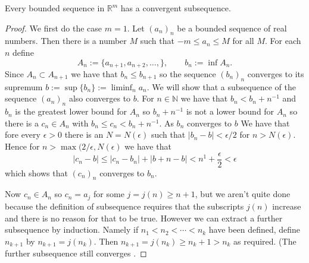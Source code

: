 \documentclass[10pt,a4paper,UTF8]{article}
\begin{document}
\begin{theorem}
Every bounded sequence in \(\mathbb{R}^m\) has a convergent subsequence.
\end{theorem}

\begin{proof}
We first do the case \(m=1\). Let \((a_n)_n\) be a bounded sequence of real numbers. Then
there is a number \(M\) such that \(-m\le a_n\le M\) for all \(M\). For each \(n\) define
\begin{equation*}
  A_n:=\{a_{n+1},a_{n+2},\ldots,\}, \qquad b_n:=\inf A_n.
\end{equation*}
Since \(A_n\subset A_{n+1}\) we have that \(b_n\le b_{n+1}\) so the sequence \((b_n)_n\) converges to its supremum
\(b:=\sup\{b_n\}:=\liminf_n a_n\). We will show that a subsequence of the sequence \((a_n)_n\) also converges to \(b\).
For \(n\in\mathbb{N}\) we have that \(b_n < b_n+n^{-1}\) and \(b_n\) is the greatest lower bound for \(A_n\) so \(b_n+n^{-1}\) is not a lower bound
for \(A_n\) so there is a \(c_n\in A_n\) with \(b_n\le c_n < b_n+n^{-1}\). As \(b_n\) converges to \(b\) We have that fore every \(\epsilon > 0\) there is an \(N=N(\epsilon)\) such that
\(|b_n-b| < \epsilon/2\) for \(n > N(\epsilon)\). Hence for \(n > \max(2/\epsilon,N(\epsilon)\) we have that
\begin{equation}
\label{eq:1}
|c_n-b|\le |c_n-b_n|+|b+n-b|  < n^{1}+\frac{\epsilon}{2} < \epsilon
\end{equation}
which shows that \((c_n)_n\) converges to \(b_n\).

Now \(c_n\in A_n\) so \(c_n=a_j\) for some \(j=j(n)\ge n+1\),
but we aren't quite done because the definition of subsequence requires that
the subscripts \(j(n)\) increase and there is no reason for that to be true. However we can extract
a further subsequence by induction. Namely if \(n_1 < n_2 < \cdots < n_k\) have been defined,
define \(n_{k+1}\) by \(n_{k+1}=j(n_k)\). Then \(n_{k+1}=j(n_k)\ge n_k+1 > n_k\) as required.
(The further subsequence still converges .


\end{proof}
\end{document}
